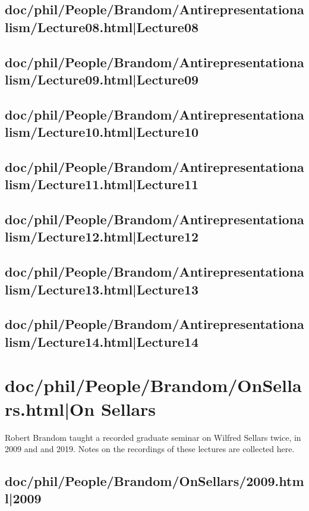 \documentclass[12pt,a4paper]{report}
\begin{document}
\section{doc/phil/People/Brandom/Antirepresentationalism/Lecture08.html|Lecture08}

\section{doc/phil/People/Brandom/Antirepresentationalism/Lecture09.html|Lecture09}

\section{doc/phil/People/Brandom/Antirepresentationalism/Lecture10.html|Lecture10}

\section{doc/phil/People/Brandom/Antirepresentationalism/Lecture11.html|Lecture11}

\section{doc/phil/People/Brandom/Antirepresentationalism/Lecture12.html|Lecture12}

\section{doc/phil/People/Brandom/Antirepresentationalism/Lecture13.html|Lecture13}

\section{doc/phil/People/Brandom/Antirepresentationalism/Lecture14.html|Lecture14}

\chapter{doc/phil/People/Brandom/OnSellars.html|On Sellars}
Robert Brandom taught a recorded graduate seminar on Wilfred Sellars twice, in 2009 and and 2019. Notes on the recordings of these lectures are collected here.
\section{doc/phil/People/Brandom/OnSellars/2009.html|2009}
\end{document}

